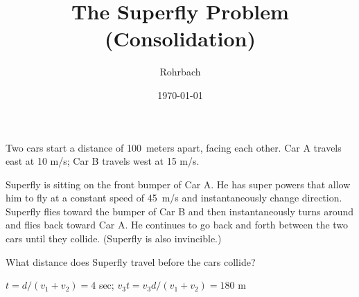 \documentclass[10pt]{exam}
\title{The Superfly Problem (Consolidation)}
\author{Rohrbach}
\date{\today}
\begin{document}
\maketitle

\newcommand{\prob}{
  \noindent
  Two cars start a distance of 100~meters apart, facing each other.  Car A travels east at 10 m/s; Car B travels west at 15 m/s.

  \vspace{1em}

  \noindent
  Superfly is sitting on the front bumper of Car A.  He has super powers that allow him to fly at a constant speed of 45~m/s and instantaneously change direction.  Superfly flies toward the bumper of Car B and then instantaneously turns around and flies back toward Car A.  He continues to go back and forth between the two cars until they collide.  (Superfly is also invincible.)

  \vspace{1em}

  \noindent
  What distance does Superfly travel before the cars collide?

  \begin{solution}
    $t=d/(v_1+v_2) = 4$ sec;  $v_3 t = v_3 d/(v_1+v_2) = 180$ m
  \end{solution}
}

\prob
\end{document}
